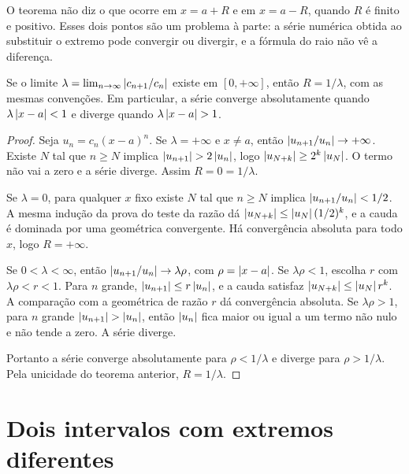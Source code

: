\documentclass[11pt,a4paper]{article}
\begin{document}
O teorema não diz o que ocorre em \(x=a+R\) e em \(x=a-R\), quando \(R\) é finito e positivo. Esses dois pontos são um problema à parte: a série numérica obtida ao substituir o extremo pode convergir ou divergir, e a fórmula do raio não vê a diferença.

\begin{teorema}
Se o limite \(\lambda=\lim_{n\to\infty}\left\lvert c_{n+1}/c_n \right\rvert\) existe em \([0,+\infty]\), então \(R=1/\lambda\), com as mesmas convenções. Em particular, a série converge absolutamente quando \(\lambda\left\lvert x-a \right\rvert<1\) e diverge quando \(\lambda\left\lvert x-a \right\rvert>1\).
\end{teorema}

\begin{proof}
Seja \(u_n=c_n(x-a)^n\). Se \(\lambda=+\infty\) e \(x\neq a\), então \(\left\lvert u_{n+1}/u_n \right\rvert\to+\infty\). Existe \(N\) tal que \(n\ge N\) implica \(\left\lvert u_{n+1} \right\rvert>2\left\lvert u_n \right\rvert\), logo \(\left\lvert u_{N+k} \right\rvert\ge 2^k\left\lvert u_N \right\rvert\). O termo não vai a zero e a série diverge. Assim \(R=0=1/\lambda\).

Se \(\lambda=0\), para qualquer \(x\) fixo existe \(N\) tal que \(n\ge N\) implica \(\left\lvert u_{n+1}/u_n \right\rvert<1/2\). A mesma indução da prova do teste da razão dá \(\left\lvert u_{N+k} \right\rvert\le\left\lvert u_N \right\rvert(1/2)^k\), e a cauda é dominada por uma geométrica convergente. Há convergência absoluta para todo \(x\), logo \(R=+\infty\).

Se \(0<\lambda<\infty\), então \(\left\lvert u_{n+1}/u_n \right\rvert\to\lambda\rho\), com \(\rho=\left\lvert x-a \right\rvert\). Se \(\lambda\rho<1\), escolha \(r\) com \(\lambda\rho<r<1\). Para \(n\) grande, \(\left\lvert u_{n+1} \right\rvert\le r\left\lvert u_n \right\rvert\), e a cauda satisfaz \(\left\lvert u_{N+k} \right\rvert\le\left\lvert u_N \right\rvert r^k\). A comparação com a geométrica de razão \(r\) dá convergência absoluta. Se \(\lambda\rho>1\), para \(n\) grande \(\left\lvert u_{n+1} \right\rvert>\left\lvert u_n \right\rvert\), então \(\left\lvert u_n \right\rvert\) fica maior ou igual a um termo não nulo e não tende a zero. A série diverge.

Portanto a série converge absolutamente para \(\rho<1/\lambda\) e diverge para \(\rho>1/\lambda\). Pela unicidade do teorema anterior, \(R=1/\lambda\).
\end{proof}

\section{Dois intervalos com extremos diferentes}
\end{document}
